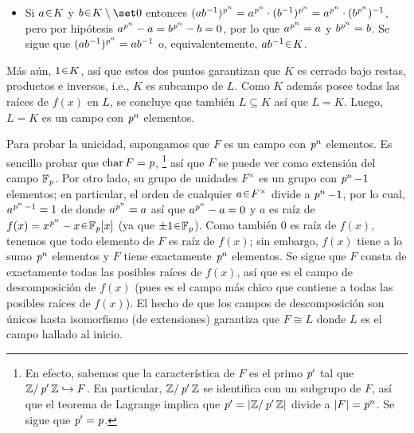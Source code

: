 \begin{sol}
\begin{enumerate}[label=\alph*)]
\begin{itemize}
    \item Si $a\en K$ y $b\en K\setminus\set0$ entonces $(ab^{-1})^{\operatorname{\textit{p}}^n} = a^{\operatorname{\textit{p}}^n}\cdot(b^{-1})^{\operatorname{\textit{p}}^n} = a^{\operatorname{\textit{p}}^n}\cdot (b^{\operatorname{\textit{p}}^n})^{-1}$, pero por hipótesis $a^{\operatorname{\textit{p}}^n}-a=b^{\operatorname{\textit{p}}^n}-b=0$, por lo que $a^{\operatorname{\textit{p}}^n}=a$ y $b^{\operatorname{\textit{p}}^n}=b$. Se sigue que $(ab^{-1})^{\operatorname{\textit{p}}^n} = ab^{-1}$ o, equivalentemente, $ab^{-1}\en K$.
\end{itemize}
Más aún, $1\en K$, así que estos dos puntos garantizan que $K$ es cerrado bajo restas, productos e inversos, i.e., $K$ es subcampo de $L$. Como $K$ además posee todas las raíces de $f(x)$ en $L$, se concluye que también $L \subseteq K$ así que $L = K$. Luego, $L=K$ es un campo con $\operatorname{\textit{p}}^n$ elementos.\par
Para probar la unicidad, supongamos que $F$ es un campo con $\operatorname{\textit{p}}^n$ elementos. Es sencillo probar que $\operatorname{char} F = \operatorname{\textit{p}}$,%
\footnote{
    En efecto, sabemos que la característica de $F$ es el primo $\operatorname{\textit{p}}'$ tal que $\mathbb{Z}/\operatorname{\textit{p}}'\mathbb{Z} \hookrightarrow F$. En particular, $\mathbb{Z}/\operatorname{\textit{p}}'\mathbb{Z}$ se identifica con un subgrupo de $F$, así que el teorema de Lagrange implica que $\operatorname{\textit{p}}'=\abs{\mathbb{Z}/\operatorname{\textit{p}}'\mathbb{Z}}$ divide a $\abs{F} = \operatorname{\textit{p}}^n$. Se sigue que $\operatorname{\textit{p}}'=\operatorname{\textit{p}}$.
}
así que $F$ se puede ver como extensión del campo $\mathbb{F}_{\operatorname{\textit{p}}}$. Por otro lado, su grupo de unidades $F^\times$ es un grupo con $\operatorname{\textit{p}}^n-1$ elementos; en particular, el orden de cualquier $a\en F^\times$ divide a $\operatorname{\textit{p}}^n-1$, por lo cual, $a^{\operatorname{\textit{p}}^n-1} = 1$ de donde $a^{\operatorname{\textit{p}}^n} = a$ así que $a^{\operatorname{\textit{p}}^n}-a=0$ y $a$ es raíz de $f(x) = x^{\p^n}-x \en \mathbb{F}_{\p}[x]$ (ya que $\pm 1 \en \mathbb{F}_{\p}$). Como también $0$ es raíz de $f(x)$, tenemos que todo elemento de $F$ es raíz de $f(x)$; sin embargo, $f(x)$ tiene a lo sumo $\operatorname{\textit{p}}^n$ elementos y $F$ tiene exactamente $\operatorname{\textit{p}}^n$ elementos. Se sigue que $F$ consta de exactamente todas las posibles raíces de $f(x)$, así que es el campo de descomposición de $f(x)$ (pues es el campo más chico que contiene a todas las posibles raíces de $f(x)$). El hecho de que los campos de descomposición son únicos hasta isomorfismo (de extensiones) garantiza que $F \cong L$ donde $L$ es el campo hallado al inicio.



\end{enumerate}
\end{sol}
